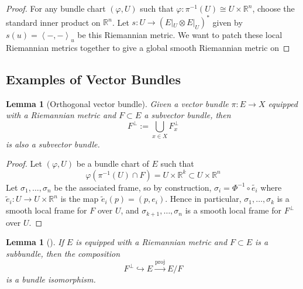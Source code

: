 \documentclass[reqno]{amsart}
\newtheorem{lemma}[theorem]{Lemma}
\theoremstyle{definition}
\theoremstyle{remark}
\begin{document}
    \begin{proof}
        For any bundle chart
        $\left( \varphi ,U \right) $ such that
        $\varphi \colon \pi^{-1}(U) \cong
        U \times \mathbb{R}^{n}$, choose
        the standard inner product on $\mathbb{R}^{n}$.
        Let
        $s \colon U \to \left( E|_U \otimes
        E|_U \right)^{*}$ given by
        $s(u) = \left<-, - \right>_u$ be this
        Riemannian metric. We want to patch
        these local Riemannian metrics together
        to give a global smooth Riemannian metric on
        
    \end{proof}

    \subsection{Examples of Vector Bundles}

    \begin{lemma}[Orthogonal vector bundle]
        Given a vector bundle $\pi \colon E \to X$ equipped
        with a Riemannian metric and $F \subset 
        E$ a subvector bundle, then
        \[
        F^{\perp} := \bigcup_{x \in X} F_x^{\perp}
        \] 
        is also a subvector bundle.
    \end{lemma}

    \begin{proof}
        Let $\left( \varphi , U \right) $ be a bundle
        chart of $E$ such that
        \[
        \varphi \left( \pi^{-1}(U) \cap F \right) 
        = U \times \mathbb{R}^{k} \subset U \times \mathbb{R}^{n}
        \] 
        Let $\sigma_1, \ldots, \sigma_n$ be the
        associated frame, so by construction,
        $\sigma_i = \Phi^{-1} \circ \tilde{e_i}$ where
        $\tilde{e}_i \colon U \to U \times \mathbb{R}^{n}$ 
        is the map
        $\tilde{e}_i (p) = 
        \left( p, e_i \right) $.
        Hence in particular,
        $\sigma_1, \ldots, \sigma_k$ is
        a smooth local frame for $F$ over $U$, and
        $\sigma_{k+1},\ldots, \sigma_n$ is
        a smooth local frame for $F^{\perp}$ over $U$.
    \end{proof}

    \begin{lemma}[]
        If $E$ is equipped with a Riemannian metric and
        $F \subset E$ is a subbundle, then the composition
        \[
            F^{\perp} \hookrightarrow E \stackrel{\text{proj}}{\to }
            E / F
        \] 
        is a bundle isomorphism.
    \end{lemma}
\end{document}
